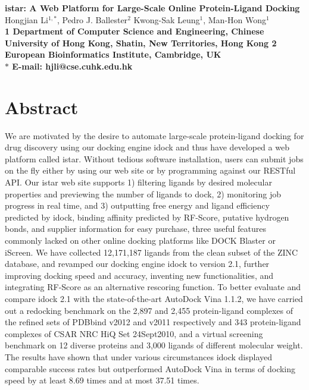 \documentclass[10pt]{article}
\date{}
\begin{document}
\begin{flushleft}
{\Large
\textbf{istar: A Web Platform for Large-Scale Online Protein-Ligand Docking}
}
\\
Hongjian Li$^{1,\ast}$, 
Pedro J. Ballester$^{2}$
Kwong-Sak Leung$^{1}$, 
Man-Hon Wong$^{1}$
\\
\bf{1} Department of Computer Science and Engineering, Chinese University of Hong Kong, Shatin, New Territories, Hong Kong
\bf{2} European Bioinformatics Institute, Cambridge, UK
\\
$\ast$ E-mail: hjli@cse.cuhk.edu.hk
\end{flushleft}

\section*{Abstract}
We are motivated by the desire to automate large-scale protein-ligand docking for drug discovery using our docking engine idock and thus have developed a web platform called istar. Without tedious software installation, users can submit jobs on the fly either by using our web site or by programming against our RESTful API. Our istar web site supports 1) filtering ligands by desired molecular properties and previewing the number of ligands to dock, 2) monitoring job progress in real time, and 3) outputting free energy and ligand efficiency predicted by idock, binding affinity predicted by RF-Score, putative hydrogen bonds, and supplier information for easy purchase, three useful features commonly lacked on other online docking platforms like DOCK Blaster or iScreen. We have collected 12,171,187 ligands from the clean subset of the ZINC database, and revamped our docking engine idock to version 2.1, further improving docking speed and accuracy, inventing new functionalities, and integrating RF-Score as an alternative rescoring function. To better evaluate and compare idock 2.1 with the state-of-the-art AutoDock Vina 1.1.2, we have carried out a redocking benchmark on the 2,897 and 2,455 protein-ligand complexes of the refined sets of PDBbind v2012 and v2011 respectively and 343 protein-ligand complexes of CSAR NRC HiQ Set 24Sept2010, and a virtual screening benchmark on 12 diverse proteins and 3,000 ligands of different molecular weight. The results have shown that under various circumstances idock displayed comparable success rates but outperformed AutoDock Vina in terms of docking speed by at least 8.69 times and at most 37.51 times. %
\end{document}

